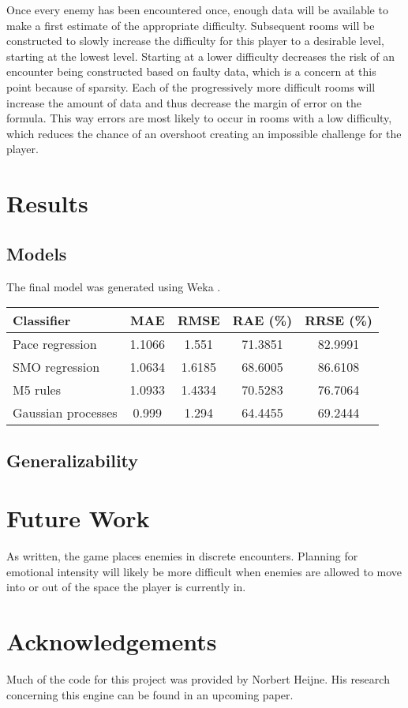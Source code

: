 \documentclass[a4paper]{article}
\begin{document}
\begin{multicols*}{2}
Once every enemy has been encountered once, enough data will be available to make a first estimate of the appropriate difficulty. Subsequent rooms will be constructed to slowly increase the difficulty for this player to a desirable level, starting at the lowest level. Starting at a lower difficulty decreases the risk of an encounter being constructed based on faulty data, which is a concern at this point because of sparsity. Each of the progressively more difficult rooms will increase the amount of data and thus decrease the margin of error on the formula. This way errors are most likely to occur in rooms with a low difficulty, which reduces the chance of an overshoot creating an impossible challenge for the player.

\section{Results} \label{fig:results}
\subsection{Models}
The final model was generated using Weka \cite{weka}.
\begin{tabular}{|l|c|c|c|c|} \hline
Classifier & MAE & RMSE & RAE (\%) & RRSE (\%) \\ \hline
Pace regression & 1.1066 & 1.551 & 71.3851 & 82.9991 \\ \hline
SMO regression & 1.0634 & 1.6185 & 68.6005 & 86.6108 \\ \hline
M5 rules & 1.0933 & 1.4334 & 70.5283 & 76.7064 \\ \hline
Gaussian processes & 0.999 & 1.294 & 64.4455 & 69.2444 \\ \hline
\end{tabular}

\subsection{Generalizability}

\section{Future Work}
As written, the game places enemies in discrete encounters. Planning for emotional intensity will likely be more difficult when enemies are allowed to move into or out of the space the player is currently in. 

\section{Acknowledgements}
Much of the code for this project was provided by Norbert Heijne. His research concerning this engine can be found in an upcoming paper.


\end{multicols*}
\end{document}
